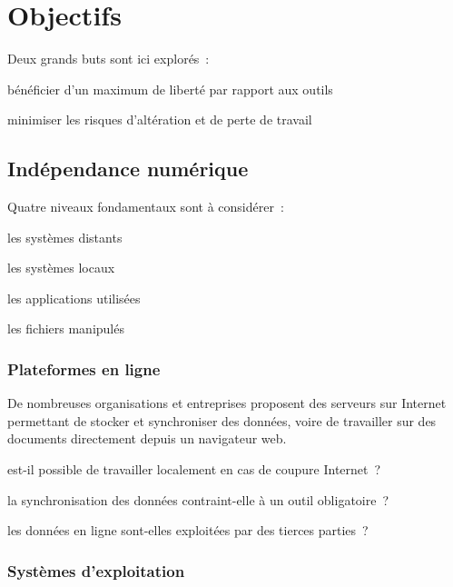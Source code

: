 \section{Objectifs}

Deux grands buts sont ici explorés :
\begin{enum}
\item{bénéficier d’un maximum de liberté par rapport aux outils}
\item{minimiser les risques d’altération et de perte de travail}
\end{enum}

\hr

\subsection{Indépendance numérique}

Quatre niveaux fondamentaux sont à considérer :
\begin{itmz}
\item{les systèmes distants}
\item{les systèmes locaux}
\item{les applications utilisées}
\item{les fichiers manipulés}
\end{itmz}

\subsubsection{Plateformes en ligne}

De nombreuses organisations et entreprises proposent des serveurs sur Internet
permettant de stocker et synchroniser des données, voire de travailler sur des
documents directement depuis un navigateur web.

\begin{itmz}
\item{est-il possible de travailler localement en cas de coupure Internet ?}
\item{la synchronisation des données contraint-elle à un outil obligatoire ?}
\item{les données en ligne sont-elles exploitées par des tierces parties ?}
\end{itmz}

\subsubsection{Systèmes d’exploitation}

